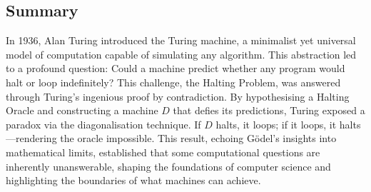 \subsection{Summary}
In 1936, Alan Turing introduced the Turing machine, a minimalist yet universal model of computation capable of simulating any algorithm. This abstraction led to a profound question: Could a machine predict whether any program would halt or loop indefinitely? This challenge, the Halting Problem, was answered through Turing's ingenious proof by contradiction. By hypothesising a Halting Oracle and constructing a machine $D$ that defies its predictions, Turing exposed a paradox via the diagonalisation technique. If $D$ halts, it loops; if it loops, it halts---rendering the oracle impossible. This result, echoing Gödel's insights into mathematical limits, established that some computational questions are inherently unanswerable, shaping the foundations of computer science and highlighting the boundaries of what machines can achieve.

